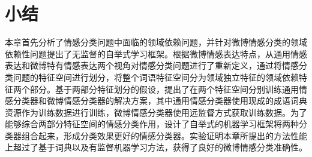 \section{小结}
\label{conclusion}
本章首先分析了情感分类问题中面临的领域依赖问题，并针对微博情感分类的领域依赖性问题提出了无监督的自举式学习框架。根据微博情感表达特点，从通用情感表达和微博特有情感表达两个视角对情感分类问题进行了重新定义，通过将情感分类问题的特征空间进行划分，将整个词语特征空间分为领域独立特征的领域依赖特征两个部分。基于两部分特征划分的假设，提出了在两个特征空间分别训练通用情感分类器和微博情感分类器的解决方案，其中通用情感分类器使用现成的成语词典资源作为训练数据进行训练，微博情感分类器使用远监督方式获取训练数据。为了能够综合两部分特征空间的情感分类作用，设计了自举式的机器学习框架将两种分类器组合起来，形成分类效果更好的情感分类器。实验证明本章所提出的方法性能上超过了基于词典以及有监督机器学习方法，获得了良好的微博情感分类准确性。
